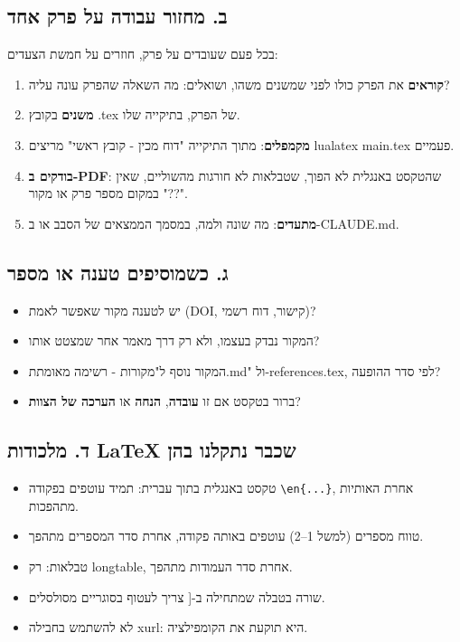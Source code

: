 \documentclass[11pt,a4paper]{article}
\newcommand{\en}[1]{\foreignlanguage{english}{#1}}
\newcommand{\cb}{\framebox[1.7ex]{\rule{0pt}{1.3ex}}}
\newenvironment{checks}{\begin{itemize}\renewcommand{\labelitemi}{\cb}}{\end{itemize}}
\begin{document}
\subsection*{ב. מחזור עבודה על פרק אחד}
בכל פעם שעובדים על פרק, חוזרים על חמשת הצעדים:
\begin{enumerate}
\item \textbf{קוראים} את הפרק כולו לפני שמשנים משהו, ושואלים: מה השאלה שהפרק עונה עליה?
\item \textbf{משנים} בקובץ \en{.tex} של הפרק, בתיקייה שלו.
\item \textbf{מקמפלים}: מתוך התיקייה "דוח מכין - קובץ ראשי" מריצים \en{lualatex main.tex} פעמיים.
\item \textbf{בודקים ב-\en{PDF}}: שהטקסט באנגלית לא הפוך, שטבלאות לא חורגות מהשוליים, שאין "??" במקום מספר פרק או מקור.
\item \textbf{מתעדים}: מה שונה ולמה, במסמך הממצאים של הסבב או ב-\en{CLAUDE.md}.
\end{enumerate}

\subsection*{ג. כשמוסיפים טענה או מספר}
\begin{checks}
\item יש לטענה מקור שאפשר לאמת (\en{DOI}, קישור, דוח רשמי)?
\item המקור נבדק בעצמו, ולא רק דרך מאמר אחר שמצטט אותו?
\item המקור נוסף ל"מקורות - רשימה מאומתת.md" ול-\en{references.tex}, לפי סדר ההופעה?
\item ברור בטקסט אם זו \textbf{עובדה}, \textbf{הנחה} או \textbf{הערכה של הצוות}?
\end{checks}

\subsection*{ד. מלכודות \en{LaTeX} שכבר נתקלנו בהן}
\begin{itemize}
\item טקסט באנגלית בתוך עברית: תמיד עוטפים בפקודה \en{\texttt{\textbackslash en\{...\}}}, אחרת האותיות מתהפכות.
\item טווח מספרים (למשל \en{1--2}) עוטפים באותה פקודה, אחרת סדר המספרים מתהפך.
\item טבלאות: רק \en{longtable}, אחרת סדר העמודות מתהפך.
\item שורה בטבלה שמתחילה ב-[ צריך לעטוף בסוגריים מסולסלים.
\item לא להשתמש בחבילה \en{xurl}: היא תוקעת את הקומפילציה.
\end{itemize}
\end{document}
